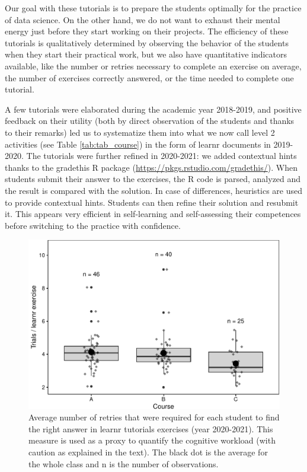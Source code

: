 \documentclass{aims}
\theoremstyle{definition}
\begin{document}
Our goal with these tutorials is to prepare the students optimally for
the practice of data science. On the other hand, we do not want to
exhaust their mental energy just before they start working on their
projects. The efficiency of these tutorials is qualitatively determined
by observing the behavior of the students when they start their
practical work, but we also have quantitative indicators available, like
the number or retries necessary to complete an exercise on average, the
number of exercises correctly answered, or the time needed to complete
one tutorial.

A few tutorials were elaborated during the academic year 2018-2019, and
positive feedback on their utility (both by direct observation of the
students and thanks to their remarks) led us to systematize them into
what we now call level 2 activities (see Table \ref {tab:tab_course}) in
the form of learnr documents in 2019-2020. The tutorials were further
refined in 2020-2021: we added contextual hints thanks to the gradethis
R package (\url{https://pkgs.rstudio.com/gradethis/}). When students
submit their answer to the exercises, the R code is parsed, analyzed and
the result is compared with the solution. In case of differences,
heuristics are used to provide contextual hints. Students can then
refine their solution and resubmit it. This appears very efficient in
self-learning and self-assessing their competences before switching to
the practice with confidence.

\begin{figure}
\includegraphics[width=1\linewidth]{teaching_data_science_files/figure-latex/fig_learn_trials-1} \caption{\label{fig:fig_learn_trials} Average number of retries that were required for each student to find the right answer in learnr tutorials exercises (year 2020-2021). This measure is used as a proxy to quantify the cognitive workload (with caution as explained in the text). The black dot is the average for the whole class and n is the number of observations.}\label{fig:fig_learn_trials}
\end{figure}
\end{document}
